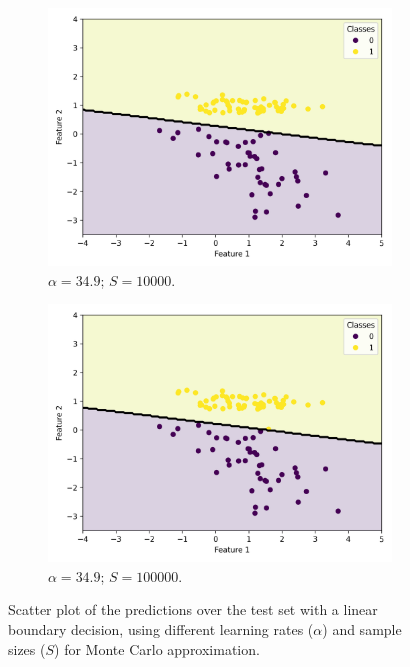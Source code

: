 \documentclass{article}
\begin{document}
\begin{figure}
\begin{subfigure}[t]{0.24\textwidth}
    \includegraphics[width=\linewidth]{scatter_predictions_with_contour_3_learning_rate_349000000_sample_10000.png}
    \caption{$\alpha = 34.9$; $S = 10000$.}
  \end{subfigure}
  \hfill
  \begin{subfigure}[t]{0.24\textwidth}
    \centering
    \includegraphics[width=\linewidth]{scatter_predictions_with_contour_3_learning_rate_349000000_sample_100000.png}
    \caption{$\alpha = 34.9$; $S = 100000$.}
  \end{subfigure}
  \caption{Scatter plot of the predictions over the test set with a linear boundary decision, using different learning rates ($\alpha$) and sample sizes ($S$) for Monte Carlo approximation.}
  \label{fig:discriminative_results}
\end{figure}
\end{document}
